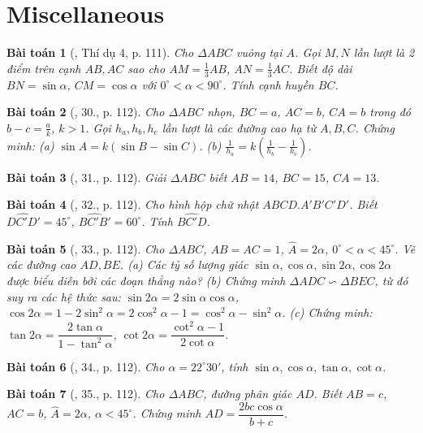 \documentclass{article}
\newtheorem{baitoan}{Bài toán}
\begin{document}

\section{Miscellaneous}

\begin{baitoan}[\cite{Tuyen_Toan_9}, Thí dụ 4, p. 111]
	Cho $\Delta ABC$ vuông tại $A$. Gọi $M,N$ lần lượt là 2 điểm trên cạnh $AB,AC$ sao cho $AM = \frac{1}{3}AB$, $AN = \frac{1}{3}AC$. Biết độ dài $BN = \sin\alpha$, $CM = \cos\alpha$ với $0^\circ < \alpha < 90^\circ$. Tính cạnh huyền $BC$.
\end{baitoan}

\begin{baitoan}[\cite{Tuyen_Toan_9}, 30., p. 112]
	Cho $\Delta ABC$ nhọn, $BC = a$, $AC = b$, $CA = b$ trong đó $b - c = \frac{a}{k}$, $k > 1$. Gọi $h_a,h_b,h_c$ lần lượt là các đường cao hạ từ $A,B,C$. Chứng minh: (a) $\sin A = k(\sin B - \sin C)$. (b) $\frac{1}{h_a} = k\left(\frac{1}{h_b} - \frac{1}{h_c}\right)$.
\end{baitoan}

\begin{baitoan}[\cite{Tuyen_Toan_9}, 31., p. 112]
	Giải $\Delta ABC$ biết $AB = 14$, $BC = 15$, $CA = 13$.
\end{baitoan}

\begin{baitoan}[\cite{Tuyen_Toan_9}, 32., p. 112]
	Cho hình hộp chữ nhật $ABCD.A'B'C'D'$. Biết $\widehat{DC'D'} = 45^\circ$, $\widehat{BC'B'} = 60^\circ$. Tính $\widehat{BC'D}$.
\end{baitoan}

\begin{baitoan}[\cite{Tuyen_Toan_9}, 33., p. 112]
	Cho $\Delta ABC$, $AB = AC = 1$, $\widehat{A} = 2\alpha$, $0^\circ < \alpha < 45^\circ$. Vẽ các đường cao $AD,BE$. (a) Các tỷ số lượng giác $\sin\alpha,\cos\alpha,\sin2\alpha,\cos2\alpha$ được biểu diễn bởi các đoạn thẳng nào? (b) Chứng minh $\Delta ADC\backsim\Delta BEC$, từ đó suy ra các hệ thức sau: $\sin2\alpha = 2\sin\alpha\cos\alpha$, $\cos2\alpha = 1 - 2\sin^2\alpha = 2\cos^2\alpha - 1 = \cos^2\alpha - \sin^2\alpha$. (c) Chứng minh: $\tan2\alpha = \dfrac{2\tan\alpha}{1 - \tan^2\alpha}$, $\cot2\alpha = \dfrac{\cot^2\alpha - 1}{2\cot\alpha}$.
\end{baitoan}

\begin{baitoan}[\cite{Tuyen_Toan_9}, 34., p. 112]
	Cho $\alpha = 22^\circ30'$, tính $\sin\alpha,\cos\alpha,\tan\alpha,\cot\alpha$.
\end{baitoan}

\begin{baitoan}[\cite{Tuyen_Toan_9}, 35., p. 112]
	Cho $\Delta ABC$, đường phân giác $AD$. Biết $AB = c$, $AC = b$, $\widehat{A} = 2\alpha$, $\alpha < 45^\circ$. Chứng minh $AD = \dfrac{2bc\cos\alpha}{b + c}$.
\end{baitoan}


\printbibliography[heading=bibintoc]
	
\end{document}
